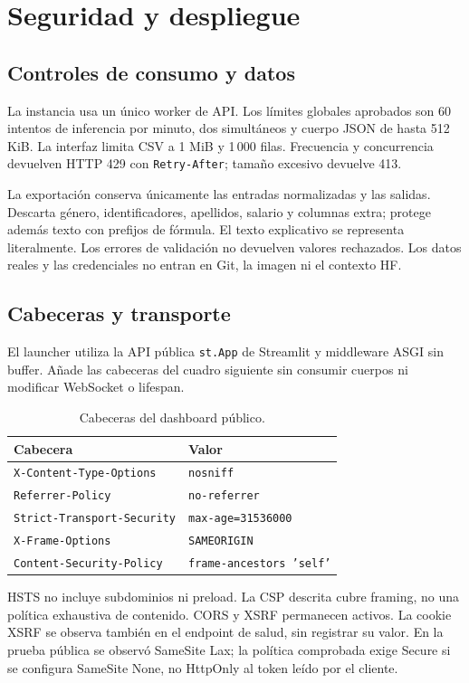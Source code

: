 \documentclass[11pt,a4paper,oneside]{report}
\begin{document}
\chapter{Seguridad y despliegue}
\section{Controles de consumo y datos}
La instancia usa un único worker de API. Los límites globales aprobados son
60 intentos de inferencia por minuto, dos simultáneos y cuerpo JSON de hasta
512 KiB. La interfaz limita CSV a 1 MiB y 1\,000 filas. Frecuencia y concurrencia
devuelven HTTP 429 con \texttt{Retry-After}; tamaño excesivo devuelve 413.

La exportación conserva únicamente las entradas normalizadas y las salidas.
Descarta género, identificadores, apellidos, salario y columnas extra; protege
además texto con prefijos de fórmula. El texto explicativo se representa
literalmente. Los errores de validación no devuelven valores rechazados.
Los datos reales y las credenciales no entran en Git, la imagen ni el contexto HF.

\section{Cabeceras y transporte}
El launcher  utiliza la API pública
\texttt{st.App} de Streamlit y middleware ASGI sin buffer. Añade las cabeceras
del cuadro siguiente sin consumir cuerpos ni modificar WebSocket o lifespan.
\begin{table}[htbp]\centering\small
\caption{Cabeceras del dashboard público.}
\begin{tabularx}{\textwidth}{@{}lX@{}}\toprule
Cabecera & Valor \\\midrule
\texttt{X-Content-Type-Options} & \texttt{nosniff} \\
\texttt{Referrer-Policy} & \texttt{no-referrer} \\
\texttt{Strict-Transport-Security} & \texttt{max-age=31536000} \\
\texttt{X-Frame-Options} & \texttt{SAMEORIGIN} \\
\texttt{Content-Security-Policy} & \texttt{frame-ancestors 'self'} \\\bottomrule
\end{tabularx}
\end{table}
HSTS no incluye subdominios ni preload. La CSP descrita cubre framing, no
una política exhaustiva de contenido. CORS y XSRF permanecen activos. La
cookie XSRF se observa también en el endpoint de salud, sin registrar su valor.
En la prueba pública se observó SameSite Lax; la política comprobada exige
Secure si se configura SameSite None, no HttpOnly al token leído por el cliente.
\end{document}
